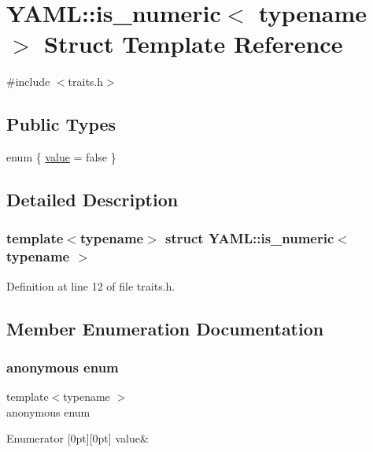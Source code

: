 \hypertarget{struct_y_a_m_l_1_1is__numeric}{}\section{Y\+A\+ML\+::is\+\_\+numeric$<$ typename $>$ Struct Template Reference}
\label{struct_y_a_m_l_1_1is__numeric}


{\ttfamily \#include $<$traits.\+h$>$}

\subsection*{Public Types}
\begin{DoxyCompactItemize}
\item 
enum \{ \mbox{\hyperlink{struct_y_a_m_l_1_1is__numeric_aa23bb2c211a8e399870d6f672671368aa019f3a5e4c0e1d4596afc293c95f3c13}{value}} = false
 \}
\end{DoxyCompactItemize}


\subsection{Detailed Description}
\subsubsection*{template$<$typename$>$\newline
struct Y\+A\+M\+L\+::is\+\_\+numeric$<$ typename $>$}



Definition at line 12 of file traits.\+h.



\subsection{Member Enumeration Documentation}
\mbox{\label{struct_y_a_m_l_1_1is__numeric_aa23bb2c211a8e399870d6f672671368a}} 
\subsubsection{\texorpdfstring{anonymous enum}{anonymous enum}}
{\footnotesize\ttfamily template$<$typename $>$ \\
anonymous enum}

\begin{DoxyEnumFields}{Enumerator}
[0pt][0pt]{}\mbox{\label{struct_y_a_m_l_1_1is__numeric_aa23bb2c211a8e399870d6f672671368aa019f3a5e4c0e1d4596afc293c95f3c13}} 
value&\\
\hline

\end{DoxyEnumFields}


